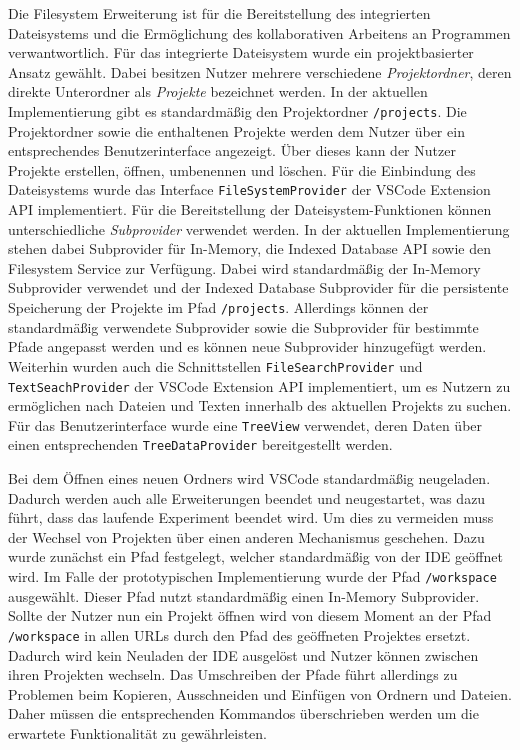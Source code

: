 Die Filesystem Erweiterung ist für die Bereitstellung des integrierten Dateisystems und die Ermöglichung des kollaborativen Arbeitens an Programmen verwantwortlich. Für das integrierte Dateisystem wurde ein projektbasierter Ansatz gewählt. Dabei besitzen Nutzer mehrere verschiedene \textit{Projektordner}, deren direkte Unterordner als \textit{Projekte} bezeichnet werden. In der aktuellen Implementierung gibt es standardmäßig den Projektordner \texttt{/projects}. Die Projektordner sowie die enthaltenen Projekte werden dem Nutzer über ein entsprechendes Benutzerinterface angezeigt. Über dieses kann der Nutzer Projekte erstellen, öffnen, umbenennen und löschen. Für die Einbindung des Dateisystems wurde das Interface \texttt{FileSystemProvider} der VSCode Extension API implementiert. Für die Bereitstellung der Dateisystem-Funktionen können unterschiedliche \textit{Subprovider} verwendet werden. In der aktuellen Implementierung stehen dabei Subprovider für In-Memory, die Indexed Database API sowie den Filesystem Service zur Verfügung. Dabei wird standardmäßig der In-Memory Subprovider verwendet und der Indexed Database Subprovider für die persistente Speicherung der Projekte im Pfad \texttt{/projects}. Allerdings können der standardmäßig verwendete Subprovider sowie die Subprovider für bestimmte Pfade angepasst werden und es können neue Subprovider hinzugefügt werden. Weiterhin wurden auch die Schnittstellen \texttt{FileSearchProvider} und \texttt{TextSeachProvider} der VSCode Extension API implementiert, um es Nutzern zu ermöglichen nach Dateien und Texten innerhalb des aktuellen Projekts zu suchen. Für das Benutzerinterface wurde eine \texttt{TreeView} verwendet, deren Daten über einen entsprechenden \texttt{TreeDataProvider} bereitgestellt werden.

Bei dem Öffnen eines neuen Ordners wird VSCode standardmäßig neugeladen. Dadurch werden auch alle Erweiterungen beendet und neugestartet, was dazu führt, dass das laufende Experiment beendet wird. Um dies zu vermeiden muss der Wechsel von Projekten über einen anderen Mechanismus geschehen. Dazu wurde zunächst ein Pfad festgelegt, welcher standardmäßig von der IDE geöffnet wird. Im Falle der prototypischen Implementierung wurde der Pfad \texttt{/workspace} ausgewählt. Dieser Pfad nutzt standardmäßig einen In-Memory Subprovider. Sollte der Nutzer nun ein Projekt öffnen wird von diesem Moment an der Pfad \texttt{/workspace} in allen URLs durch den Pfad des geöffneten Projektes ersetzt. Dadurch wird kein Neuladen der IDE ausgelöst und Nutzer können zwischen ihren Projekten wechseln. Das Umschreiben der Pfade führt allerdings zu Problemen beim Kopieren, Ausschneiden und Einfügen von Ordnern und Dateien. Daher müssen die entsprechenden Kommandos überschrieben werden um die erwartete Funktionalität zu gewährleisten.

